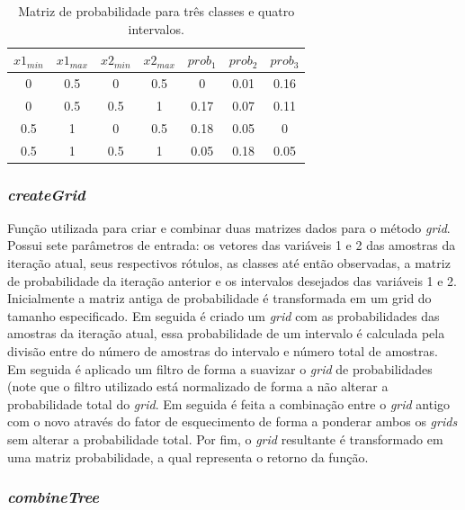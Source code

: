 \documentclass[conference]{IEEEtran}
\begin{document}
\begin{table}[h]
\caption{Matriz de probabilidade para três classes e quatro intervalos.}
\tabcolsep=0.12cm
\begin{center}
\begin{tabular}{ccccccc}
\hline
$x1_{min}$ & $x1_{max}$ & $x2_{min}$ & $x2_{max}$ & $prob_{1}$ & $prob_{2}$ & $prob_{3}$ \\ \hline
0 & 0.5 & 0 & 0.5 & 0      & 0.01 & 0.16 \\
0 & 0.5 & 0.5 & 1 & 0.17 & 0.07 & 0.11 \\
0.5 & 1 & 0 & 0.5 & 0.18 & 0.05 & 0      \\
0.5 & 1 & 0.5 & 1 & 0.05 & 0.18 & 0.05 \\ \hline
\end{tabular}
\label{pmatrix}
\end{center}
\end{table}

\subsubsection{\textit{createGrid}} \label{metod_21}

Função utilizada para criar e combinar duas matrizes dados para o método \textit{grid}. Possui sete parâmetros de entrada: os vetores das variáveis 1 e 2 das amostras da iteração atual, seus respectivos rótulos, as classes até então observadas, a matriz de probabilidade da iteração anterior e os intervalos desejados das variáveis 1 e 2. Inicialmente a matriz antiga de probabilidade é transformada em um grid do tamanho especificado. Em seguida é criado um \textit{grid} com as probabilidades das amostras da iteração atual, essa probabilidade de um intervalo é calculada pela divisão entre do número de amostras do intervalo e número total de amostras. Em seguida é aplicado um filtro de forma a suavizar o \textit{grid} de probabilidades (note que o filtro utilizado está normalizado de forma a não alterar a probabilidade total do \textit{grid}. Em seguida é feita a combinação entre o \textit{grid} antigo com o novo através do fator de esquecimento de forma a ponderar ambos os \textit{grids} sem alterar a probabilidade total. Por fim, o \textit{grid} resultante é transformado em uma matriz probabilidade, a qual representa o retorno da função.

\subsubsection{\textit{combineTree}} \label{metod_22}
\end{document}
